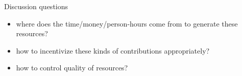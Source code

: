 
\begin{frame}{Discussion questions}

\begin{itemize}
        \item where does the time/money/person-hours come from to generate these resources?
        \item how to incentivize these kinds of contributions appropriately?
        \item how to control quality of resources?
\end{itemize}
\end{frame}



